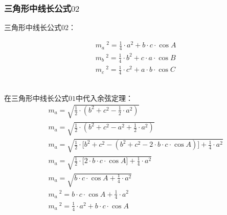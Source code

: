 \documentclass[UTF8]{ctexart}
\begin{document}
\subsubsection{三角形中线长公式$02$}
    三角形中线长公式$02$：
    \begin{large}
        \begin{align*}
            &m_a~^2=\frac{1}{4}\cdot a^2+b\cdot c\cdot\cos{A}\\[3mm]
            &m_b~^2=\frac{1}{4}\cdot b^2+c\cdot a\cdot\cos{B}\\[3mm]
            &m_c~^2=\frac{1}{4}\cdot c^2+a\cdot b\cdot\cos{C}
        \end{align*}
    \end{large}\\
    在三角形中线长公式$01$中代入余弦定理：\vspace{8pt}
    \setcounter{equation}{0}
    \begin{align}
        &m_a=\sqrt{\frac{1}{2}\cdot\left(b^2+c^2-\frac{1}{2}\cdot a^2\right)}\\[3mm]
        &m_a=\sqrt{\frac{1}{2}\cdot\left(b^2+c^2-a^2+\frac{1}{2}\cdot a^2\right)}\\[3mm]
        &m_a=\sqrt{\frac{1}{2}\cdot\Big[b^2+c^2-\left(b^2+c^2-2\cdot b\cdot c\cdot\cos{A}\right)\Big]+\frac{1}{4}\cdot a^2}\\[3mm]
        &m_a=\sqrt{\frac{1}{2}\cdot\Big[2\cdot b\cdot c\cdot\cos{A}\Big]+\frac{1}{4}\cdot a^2}\\[3mm]
        &m_a=\sqrt{b\cdot c\cdot\cos{A}+\frac{1}{4}\cdot a^2}\\[3mm]
        &m_a~^2=b\cdot c\cdot\cos{A}+\frac{1}{4}\cdot a^2\\[3mm]
        &m_a~^2=\frac{1}{4}\cdot a^2+b\cdot c\cdot\cos{A}
    \end{align}
    
\newpage
\end{document}
